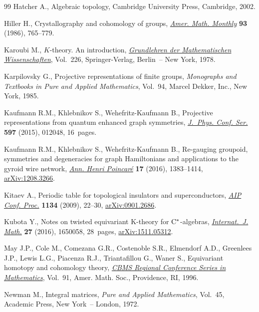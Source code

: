 \documentclass[pdftex]{sigma}
\theoremstyle{definition}
\begin{document}
\begin{thebibliography}{99}
Hatcher A., Algebraic topology, Cambridge University Press, Cambridge, 2002.

Hiller H., Crystallography and cohomology of groups, \href{https://doi.org/10.2307/2322930}{\textit{Amer. Math.
 Monthly}} \textbf{93} (1986), 765--779.

Karoubi M., {$K$}-theory. {A}n introduction, \href{https://doi.org/10.1007/978-3-540-79890-3}{\textit{Grundlehren der
 Mathematischen Wissenschaften}}, Vol.~226, Springer-Verlag, Berlin~-- New
 York, 1978.

Karpilovsky G., Projective representations of f\/inite groups, \textit{Monographs
 and Textbooks in Pure and Applied Mathematics}, Vol.~94, Marcel Dekker, Inc.,
 New York, 1985.

Kaufmann R.M., Khlebnikov S., Wehefritz-Kaufmann B., Projective representations
 from quantum enhanced graph symmetries, \href{https://doi.org/10.1088/1742-6596/597/1/012048}{\textit{J.~Phys. Conf. Ser.}}
 \textbf{597} (2015), 012048, 16~pages.

Kaufmann R.M., Khlebnikov S., Wehefritz-Kaufmann B., Re-gauging groupoid,
 symmetries and degeneracies for graph {H}amiltonians and applications to the
 gyroid wire network, \href{https://doi.org/10.1007/s00023-015-0443-8}{\textit{Ann. Henri Poincar\'e}} \textbf{17} (2016),
 1383--1414, \href{http://arxiv.org/abs/1208.3266}{arXiv:1208.3266}.

Kitaev A., Periodic table for topological insulators and superconductors,
 \href{https://doi.org/10.1063/1.3149495}{\textit{AIP Conf. Proc.}} \textbf{1134} (2009), 22--30, \href{http://arxiv.org/abs/0901.2686}{arXiv:0901.2686}.

Kubota Y., Notes on twisted equivariant {K}-theory for {$\rm C^*$}-algebras,
 \href{https://doi.org/10.1142/S0129167X16500580}{\textit{Internat.~J. Math.}} \textbf{27} (2016), 1650058, 28~pages,
 \href{http://arxiv.org/abs/1511.05312}{arXiv:1511.05312}.

May J.P., Cole M., Comezana G.R., Costenoble S.R., Elmendorf A.D., Greenlees
 J.P., Lewis L.G., Piacenza R.J., Triantaf\/illou G., Waner S., Equivariant
 homotopy and cohomology theory, \href{https://doi.org/10.1090/cbms/091}{\textit{CBMS Regional Conference Series in
 Mathematics}}, Vol.~91, Amer. Math. Soc., Providence, RI, 1996.

Newman M., Integral matrices, \textit{Pure and Applied Mathematics}, Vol.~45,
 Academic Press, New York~-- London, 1972.


\end{thebibliography}
\end{document}
